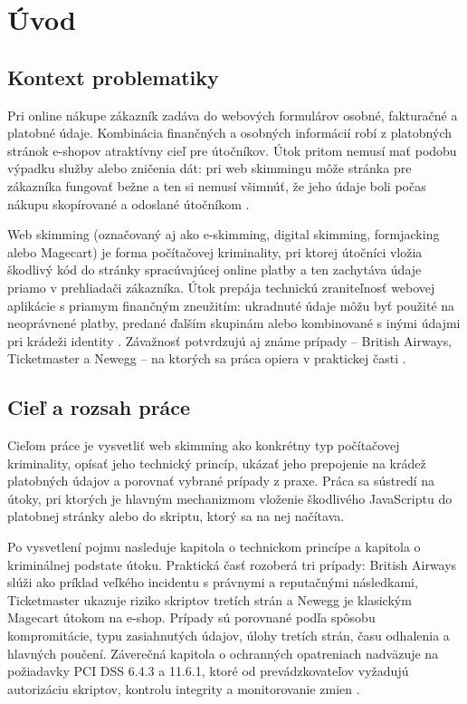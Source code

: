 \section{Úvod}

\subsection{Kontext problematiky}

Pri online nákupe zákazník zadáva do webových formulárov osobné, fakturačné a platobné údaje. Kombinácia finančných a osobných informácií robí z platobných stránok e-shopov atraktívny cieľ pre útočníkov. Útok pritom nemusí mať podobu výpadku služby alebo zničenia dát: pri web skimmingu môže stránka pre zákazníka fungovať bežne a ten si nemusí všimnúť, že jeho údaje boli počas nákupu skopírované a odoslané útočníkom \cite{cisa2020eskimming,europolDigitalSkimming}.

Web skimming (označovaný aj ako e-skimming, digital skimming, formjacking alebo Magecart) je forma počítačovej kriminality, pri ktorej útočníci vložia škodlivý kód do stránky spracúvajúcej online platby a ten zachytáva údaje priamo v prehliadači zákazníka. Útok prepája technickú zraniteľnosť webovej aplikácie s priamym finančným zneužitím: ukradnuté údaje môžu byť použité na neoprávnené platby, predané ďalším skupinám alebo kombinované s inými údajmi pri krádeži identity \cite{fbi2019eskimming,cisa2020eskimming,europolDigitalSkimming}. Závažnosť potvrdzujú aj známe prípady -- British Airways, Ticketmaster a Newegg -- na ktorých sa práca opiera v praktickej časti \cite{edpb2019BritishAirways,ico2020Ticketmaster,volexity2018Newegg}.

\subsection{Cieľ a rozsah práce}

Cieľom práce je vysvetliť web skimming ako konkrétny typ počítačovej kriminality, opísať jeho technický princíp, ukázať jeho prepojenie na krádež platobných údajov a porovnať vybrané prípady z praxe. Práca sa sústredí na útoky, pri ktorých je hlavným mechanizmom vloženie škodlivého JavaScriptu do platobnej stránky alebo do skriptu, ktorý sa na nej načítava.

Po vysvetlení pojmu nasleduje kapitola o technickom princípe a kapitola o kriminálnej podstate útoku. Praktická časť rozoberá tri prípady: British Airways slúži ako príklad veľkého incidentu s právnymi a reputačnými následkami, Ticketmaster ukazuje riziko skriptov tretích strán a Newegg je klasickým Magecart útokom na e-shop. Prípady sú porovnané podľa spôsobu kompromitácie, typu zasiahnutých údajov, úlohy tretích strán, času odhalenia a hlavných poučení. Záverečná kapitola o ochranných opatreniach nadväzuje na požiadavky PCI DSS 6.4.3 a 11.6.1, ktoré od prevádzkovateľov vyžadujú autorizáciu skriptov, kontrolu integrity a monitorovanie zmien \cite{pciSsc2025PaymentPage}.

